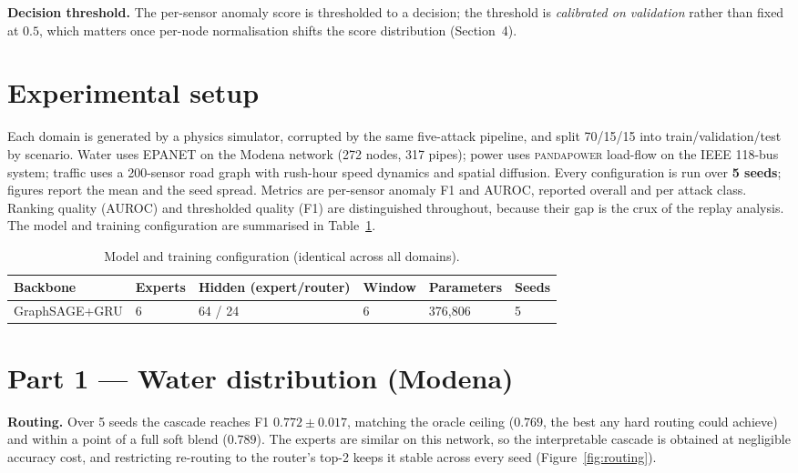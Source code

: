 \documentclass[10pt,a4paper]{article}
\begin{document}
\textbf{Decision threshold.} The per-sensor anomaly score is thresholded to
a decision; the threshold is \emph{calibrated on validation} rather than
fixed at $0.5$, which matters once per-node normalisation shifts the score
distribution (Section~4).

\section{Experimental setup}

Each domain is generated by a physics simulator, corrupted by the same
five-attack pipeline, and split 70/15/15 into train/validation/test by
scenario. Water uses EPANET on the Modena network (272 nodes, 317 pipes);
power uses \textsc{pandapower} load-flow on the IEEE 118-bus system;
traffic uses a 200-sensor road graph with rush-hour speed dynamics and
spatial diffusion. Every configuration is run over \textbf{5 seeds};
figures report the mean and the seed spread. Metrics are per-sensor anomaly
F1 and AUROC, reported overall and per attack class. Ranking quality
(AUROC) and thresholded quality (F1) are distinguished throughout, because
their gap is the crux of the replay analysis. The model and training
configuration are summarised in Table~\ref{tab:cfg}.

\begin{table}[!htb]
\centering\small
\caption{Model and training configuration (identical across all domains).}
\label{tab:cfg}
\begin{tabular}{@{}llllll@{}}
\toprule
Backbone & Experts & Hidden (expert/router) & Window & Parameters & Seeds\\
\midrule
GraphSAGE+GRU & 6 & 64 / 24 & 6 & 376{,}806 & 5\\
\bottomrule
\end{tabular}
\end{table}

\section{Part 1 --- Water distribution (Modena)}

\textbf{Routing.} Over 5 seeds the cascade reaches F1 $0.772\pm0.017$,
matching the oracle ceiling ($0.769$, the best any hard routing could
achieve) and within a point of a full soft blend ($0.789$). The experts are
similar on this network, so the interpretable cascade is obtained at
negligible accuracy cost, and restricting re-routing to the router's top-2
keeps it stable across every seed (Figure~\ref{fig:routing}).
\end{document}
